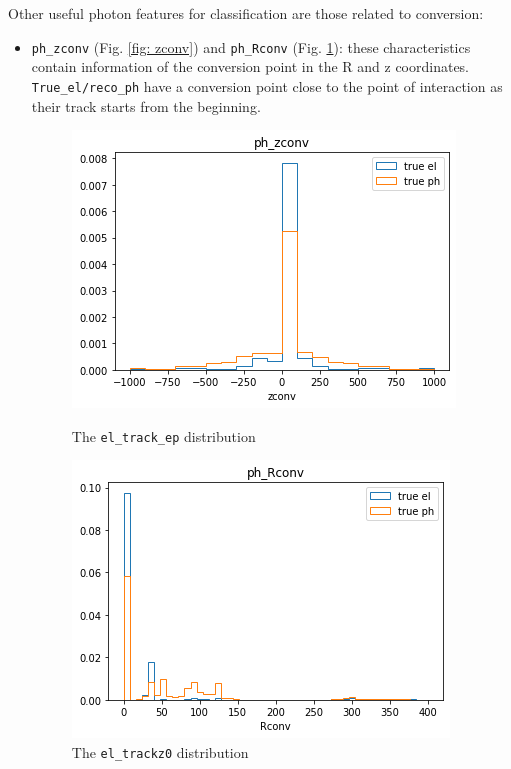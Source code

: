 \documentclass[a4paper, oneside, 11pt, openright]{book}
\begin{document}
					Other useful photon features for classification are those related to conversion:
					\begin{itemize}
						\item \texttt{ph\_zconv} (Fig. \ref{fig: zconv}) and \texttt{ph\_Rconv} (Fig. \ref{fig: Rconv}): these characteristics contain information of the conversion point in the R and z coordinates. \texttt{True\_el/reco\_ph} have a conversion point close to the point of interaction as their track starts from the beginning.
						
						\begin{figure}[h!]
							\begin{minipage}[b]{0.5\linewidth}
								\centering
								\includegraphics[width=.9\linewidth]{tesi_images/ph_zconv.png} 
								\caption{The \texttt{el\_track\_ep} distribution} 
								\label{fig: zconv}
								\vspace{4ex}
							\end{minipage}%
							\begin{minipage}[b]{0.5\linewidth}
								\centering
								\includegraphics[width=.9\linewidth]{tesi_images/ph_Rconv.png} 
								\caption{The \texttt{el\_trackz0} distribution}
								\label{fig: Rconv} 
								\vspace{4ex}
							\end{minipage} 
						\end{figure}
						

\end{itemize}
\end{document}
